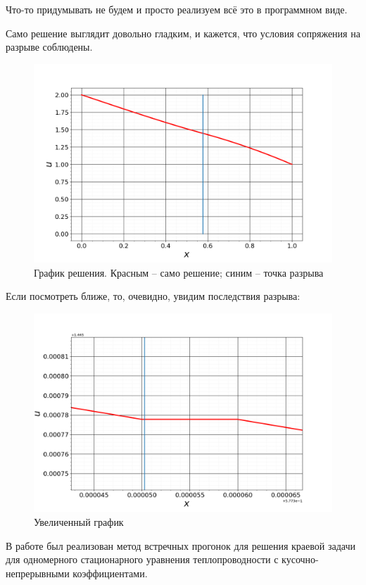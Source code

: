 		
		Что-то придумывать не будем и просто реализуем всё это в программном виде.
		
		
		\newpage
		
		Само решение выглядит довольно гладким, и кажется, что условия сопряжения на разрыве соблюдены.
		\begin{figure}[h!]
			\centering
			\includegraphics[width=0.85\linewidth]{Pictures/Solution.png}
			\caption{График решения. Красным -- само решение; синим -- точка разрыва}
		\end{figure}
	
		Если посмотреть ближе, то, очевидно, увидим последствия разрыва:
		\begin{figure}[h!]
			\centering
			\includegraphics[width=0.85\linewidth]{Pictures/Scaled.png}
			\caption{Увеличенный график}
		\end{figure}
	
		
		
		В работе был реализован метод встречных прогонок для решения краевой задачи для одномерного стационарного уравнения теплопроводности с кусочно-непрерывными коэффициентами.
		
		
